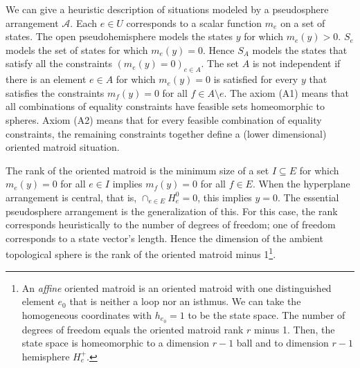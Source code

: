 \documentclass{amsproc-sunycstr}
\theoremstyle{plain}
\theoremstyle{definition}
\theoremstyle{remark}
\begin{document}
We can give a heuristic description of situations modeled by a pseudosphere
arrangement $\mathcal{A}$.  Each $e\in U$ corresponds to a scalar
function 
$m_e$ on a set of states.
The open pseudohemisphere models the 
states $y$ for which $m_e(y)>0$.   $S_e$ models the set of states for
which $m_e(y)=0$.  Hence $S_A$ models the states that satisfy all the 
constraints $(m_e(y)=0)_{e\in A}$.  The set $A$ is not independent if 
there is an element $e\in A$ for which $m_e(y)=0$ is satisfied for
every $y$ that satisfies the constraints $m_f(y)=0$ for 
all $f\in A\setminus e$.
The axiom (A1) means that all combinations of equality constraints have
feasible sets homeomorphic to spheres.   Axiom (A2) means that 
for every 
feasible combination of equality constraints, the remaining constraints
together define a (lower dimensional) oriented matroid situation.

The rank of the oriented matroid is the minimum size of a set $I\subseteq E$
for which $m_e(y)=0$ for all $e\in I$ implies $m_f(y)=0$ for all $f\in E$.
When the hyperplane arrangement is central, that is, 
$\cap_{e\in E}H^0_e=0$, this implies $y=0$.  The essential 
pseudosphere arrangement is the generalization of this.
For this case, the rank corresponds heuristically to  the number of 
degrees of freedom; one of freedom corresponds to a state vector's length.
Hence the dimension of the ambient topological sphere 
is the rank of the oriented matroid minus 1\footnote{An 
\textit{affine}
oriented matroid is an oriented matroid with one distinguished element
$e_0$ that is neither a loop nor an isthmus.  We can take the homogeneous
coordinates with $h_{e_0}=1$ to be the state space.  The number of
degrees of freedom equals the oriented matroid rank $r$ minus 1.  Then,
the state space is homeomorphic to a dimension $r-1$ ball and to 
dimension $r-1$ hemisphere $H_e^+$.}.
\end{document}
